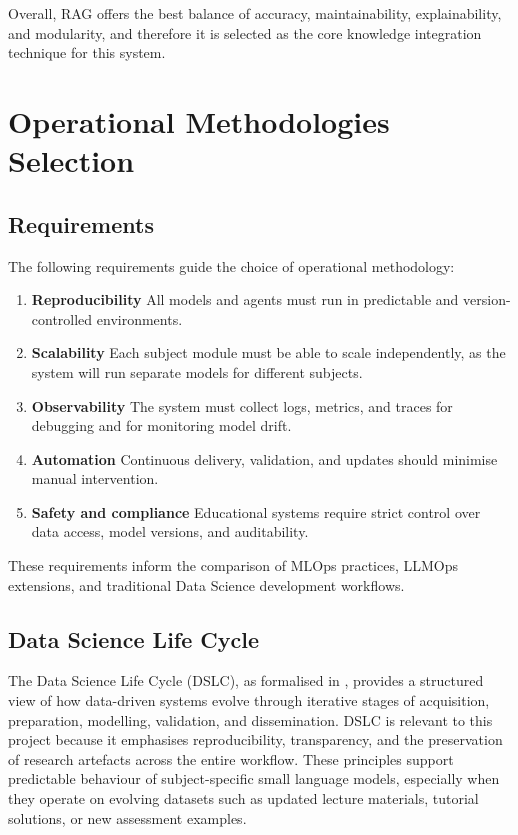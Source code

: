 Overall, RAG offers the best balance of accuracy, maintainability, explainability, and modularity, and therefore it is selected as the core knowledge integration technique for this system.

\section{Operational Methodologies Selection}
\subsection{Requirements}
The following requirements guide the choice of operational methodology:
\begin{enumerate}
    \item \textbf{Reproducibility} All models and agents must run in predictable and version-controlled environments.
    \item \textbf{Scalability} Each subject module must be able to scale independently, as the system will run separate models for different subjects.
    \item \textbf{Observability} The system must collect logs, metrics, and traces for debugging and for monitoring model drift.
    \item \textbf{Automation} Continuous delivery, validation, and updates should minimise manual intervention.
    \item \textbf{Safety and compliance} Educational systems require strict control over data access, model versions, and auditability.
\end{enumerate}

These requirements inform the comparison of MLOps practices, LLMOps extensions, and traditional Data Science development workflows.

\subsection{Data Science Life Cycle}
The Data Science Life Cycle (DSLC), as formalised in \textcite{TheDataS80:online}, provides a structured view of how data-driven systems evolve through iterative stages of acquisition, preparation, modelling, validation, and dissemination. DSLC is relevant to this project because it emphasises reproducibility, transparency, and the preservation of research artefacts across the entire workflow. These principles support predictable behaviour of subject-specific small language models, especially when they operate on evolving datasets such as updated lecture materials, tutorial solutions, or new assessment examples.

